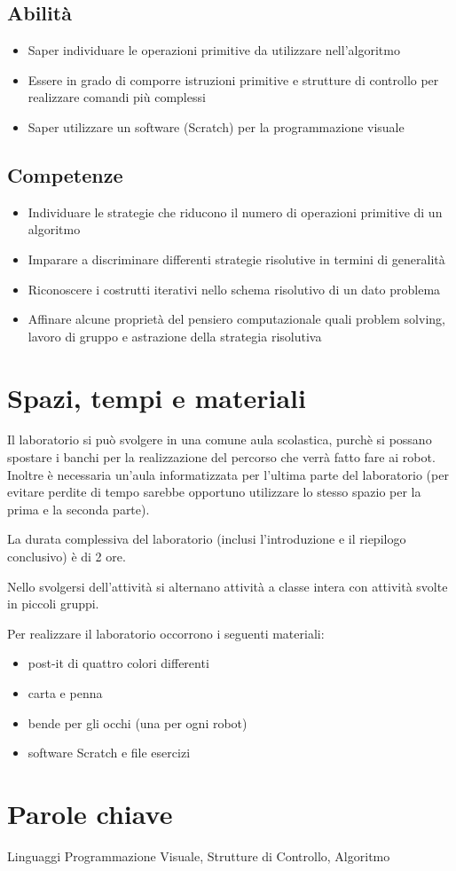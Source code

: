 \documentclass[12pt]{article}
\begin{document}
\subsection{Abilità}
\begin{itemize}
\item Saper individuare le operazioni primitive da utilizzare nell’algoritmo
\item Essere in grado di comporre istruzioni primitive e strutture di controllo per realizzare comandi più complessi
\item Saper utilizzare un software (Scratch) per la programmazione visuale
\end{itemize}

\subsection{Competenze}
\begin{itemize}
\item Individuare le strategie che riducono il numero di operazioni primitive di un algoritmo
\item Imparare a discriminare differenti strategie risolutive in termini di generalità
\item Riconoscere i costrutti iterativi nello schema risolutivo di un dato problema
\item Affinare alcune proprietà del pensiero computazionale quali problem solving, lavoro di gruppo e astrazione della strategia risolutiva
\end{itemize}
%
%
\section{Spazi, tempi e materiali}
Il laboratorio si può svolgere in una comune aula scolastica, purchè si possano spostare i banchi per la realizzazione del percorso che verrà fatto fare ai robot. Inoltre è necessaria un'aula informatizzata per l'ultima parte del laboratorio (per evitare perdite di tempo sarebbe opportuno utilizzare lo stesso spazio per la prima e la seconda parte).

La durata complessiva del laboratorio (inclusi l'introduzione e il riepilogo conclusivo) è di 2 ore.

Nello svolgersi dell'attività si alternano attività a classe intera con attività svolte in piccoli gruppi.

Per realizzare il laboratorio occorrono i seguenti materiali:
\begin{itemize}
\item post-it di quattro colori differenti
\item carta e penna
\item bende per gli occhi (una per ogni robot)
\item software Scratch e file esercizi
\end{itemize}
%
%
\section{Parole chiave}
Linguaggi Programmazione Visuale, Strutture di Controllo, Algoritmo
%
% 
\end{document}
